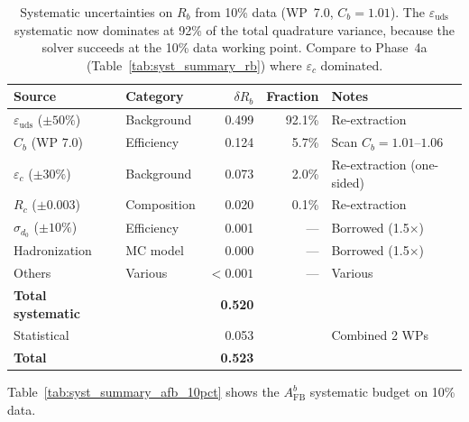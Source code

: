 \documentclass[11pt,a4paper]{article}
\begin{document}
\begin{table}[htbp]
\centering
\caption{Systematic uncertainties on $R_b$ from 10\% data (WP~7.0, $C_b = 1.01$).
The $\varepsilon_\mathrm{uds}$ systematic now dominates at 92\% of the total quadrature variance,
because the solver succeeds at the 10\% data working point. Compare to Phase~4a
(Table~\ref{tab:syst_summary_rb}) where $\varepsilon_c$ dominated.}
\label{tab:syst_summary_rb_10pct}
\small
\begin{tabular}{llrrl}
\toprule
Source & Category & $\delta R_b$ & Fraction & Notes \\
\midrule
$\varepsilon_\mathrm{uds}$ ($\pm 50\%$) & Background & 0.499 & 92.1\% & Re-extraction \\
$C_b$ (WP 7.0) & Efficiency & 0.124 & 5.7\% & Scan $C_b = 1.01$--$1.06$ \\
$\varepsilon_c$ ($\pm 30\%$) & Background & 0.073 & 2.0\% & Re-extraction (one-sided) \\
$R_c$ ($\pm 0.003$) & Composition & 0.020 & 0.1\% & Re-extraction \\
$\sigma_{d_0}$ ($\pm 10\%$) & Efficiency & 0.001 & --- & Borrowed (1.5$\times$) \\
Hadronization & MC model & 0.000 & --- & Borrowed (1.5$\times$) \\
Others & Various & $< 0.001$ & --- & Various \\
\midrule
\textbf{Total systematic} & & \textbf{0.520} & & \\
Statistical & & 0.053 & & Combined 2 WPs \\
\midrule
\textbf{Total} & & \textbf{0.523} & & \\
\bottomrule
\end{tabular}
\end{table}

Table~\ref{tab:syst_summary_afb_10pct} shows the $A_\mathrm{FB}^b$ systematic budget
on 10\% data.
\end{document}
